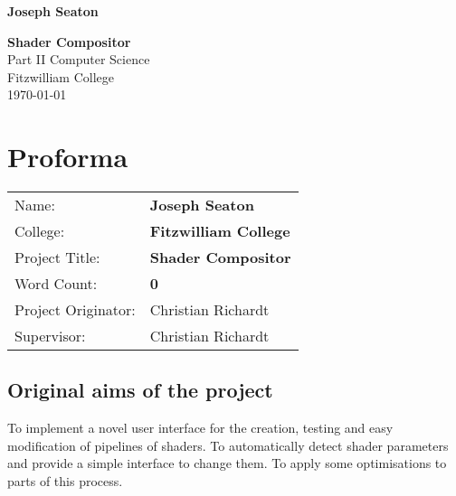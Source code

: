 \documentclass[12pt,twoside,notitlepage]{report}
\begin{document}


\newcommand{\name}{Joseph Seaton}
\newcommand{\college}{Fitzwilliam College}
\newcommand{\ptitle}{Shader Compositor}



\pagestyle{empty}

\hfill{\LARGE \bf \name}

\vspace*{60mm}
\begin{center}
\Huge
{\bf \ptitle} \\
\vspace*{5mm}
Part II Computer Science \\
\vspace*{5mm}
\college \\
\vspace*{5mm}
\today  %
\end{center}

\cleardoublepage


\setcounter{page}{1}
\pagestyle{plain}

\chapter*{Proforma}

{\large
\begin{tabular}{ll}
Name:               & \bf \name    \\
College:            & \bf \college \\
Project Title:      & \bf \ptitle  \\
Word Count:         & \bf 0\\
Project Originator: & Christian Richardt                    \\
Supervisor:         & Christian Richardt                    \\ 
\end{tabular}
}


\section*{Original aims of the project}
To implement a novel user interface for the creation, testing and easy modification of pipelines of shaders. To automatically detect shader parameters and provide a simple interface to change them. To apply some optimisations to parts of this process.
\end{document}
